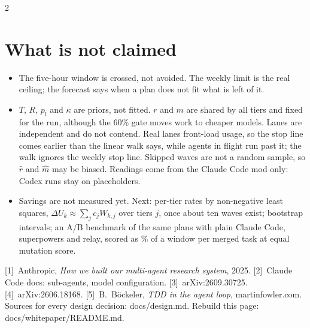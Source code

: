 \documentclass[9pt,a4paper]{extarticle}
\begin{document}
\begin{multicols}{2}
\section{What is not claimed}
\begin{itemize}
\item The five-hour window is crossed, not avoided. The weekly limit is the real ceiling; the forecast says when a plan does not fit what is left of it.
\item $T$, $R$, $p_l$ and $\kappa$ are priors, not fitted. $r$ and $m$ are shared by all tiers and fixed for the run, although the 60\% gate moves work to cheaper models. Lanes are independent and do not contend. Real lanes front-load usage, so the stop line comes earlier than the linear walk says, while agents in flight run past it; the walk ignores the weekly stop line. Skipped waves are not a random sample, so $\hat r$ and $\hat m$ may be biased. Readings come from the Claude Code mod only: Codex runs stay on placeholders.
\item Savings are not measured yet. Next: per-tier rates by non-negative least squares, $\Delta U_k\approx\sum_j c_j W_{k,j}$ over tiers $j$, once about ten waves exist; bootstrap intervals; an A/B benchmark of the same plans with plain Claude Code, superpowers and relay, scored as \% of a window per merged task at equal mutation score.
\end{itemize}

\vspace{1pt}
{\scriptsize\color{ink2}
[1]~Anthropic, \emph{How we built our multi-agent research system}, 2025.
[2]~Claude Code docs: sub-agents, model configuration.
[3]~arXiv:2609.30725. [4]~arXiv:2606.18168.
[5]~B.~Böckeler, \emph{TDD in the agent loop}, martinfowler.com.
Sources for every design decision: \textsf{docs/design.md}. Rebuild this page: \textsf{docs/whitepaper/README.md}.\par}

\end{multicols}
\end{document}
